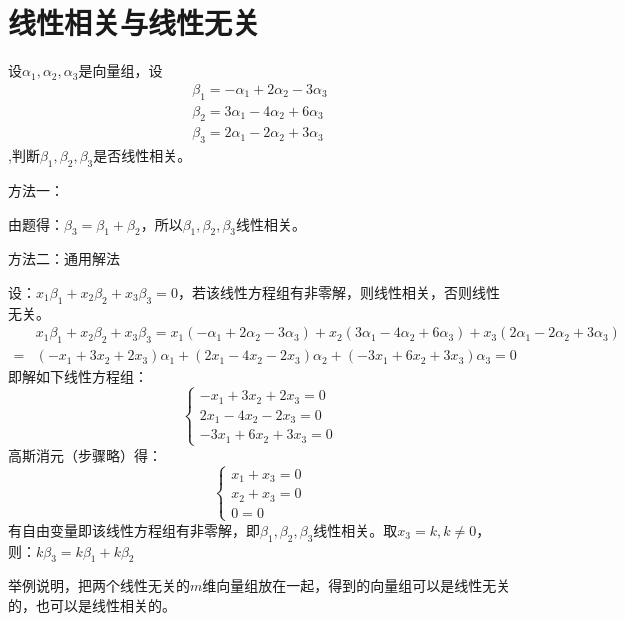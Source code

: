 \documentclass[a4paper]{report}
\begin{document}
\clearpage
\section{线性相关与线性无关}
\EX 设$\alpha_1,\alpha_2,\alpha_3$是向量组，设
\begin{gather*}
  \beta_1=-\alpha_1+2\alpha_2-3\alpha_3 \\
  \beta_2=3\alpha_1-4\alpha_2+6\alpha_3 \\
  \beta_3=2\alpha_1-2\alpha_2+3\alpha_3
\end{gather*},判断$\beta_1,\beta_2,\beta_3$是否线性相关。

\begin{jie}
方法一：

由题得：$\beta_3=\beta_1+\beta_2$，所以$\beta_1,\beta_2,\beta_3$线性相关。

方法二：通用解法

设：$x_1\beta_1+x_2\beta_2+x_3\beta_3=0$，若该线性方程组有非零解，则线性相关，否则线性无关。
\begin{align*}
&x_1\beta_1+x_2\beta_2+x_3\beta_3=x_1(-\alpha_1+2\alpha_2-3\alpha_3)+x_2(3\alpha_1-4\alpha_2+6\alpha_3)+x_3(2\alpha_1-2\alpha_2+3\alpha_3)\\
=&(-x_1+3x_2+2x_3)\alpha_1+(2x_1-4x_2-2x_3)\alpha_2+(-3x_1+6x_2+3x_3)\alpha_3=0
\end{align*}
即解如下线性方程组：
\begin{equation*}
\begin{cases}
-x_1+3x_2+2x_3=0\\
2x_1-4x_2-2x_3=0\\
-3x_1+6x_2+3x_3=0
\end{cases}
\end{equation*}
高斯消元（步骤略）得：
\begin{equation*}
\begin{cases}
x_1+x_3=0\\
x_2+x_3=0\\
0=0
\end{cases}
\end{equation*}
有自由变量即该线性方程组有非零解，即$\beta_1,\beta_2,\beta_3$线性相关。取$x_3=k,k\neq 0$，则：$k\beta_3=k\beta_1+k\beta_2$
\end{jie}

\EX 举例说明，把两个线性无关的$m$维向量组放在一起，得到的向量组可以是线性无关的，也可以是线性相关的。
\end{document}
